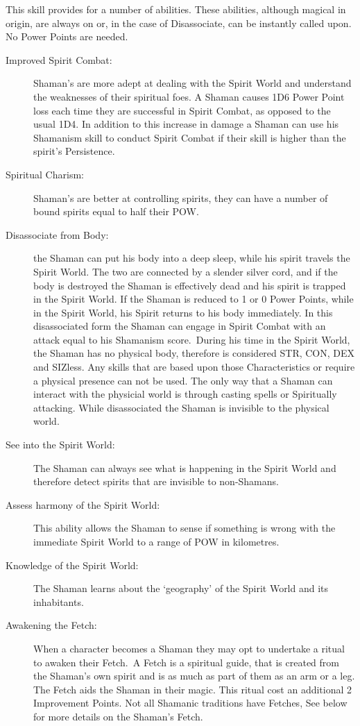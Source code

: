 This skill provides for a number of abilities. These abilities, although magical in origin, are always on or, in the case of Disassociate, can be instantly called upon. No Power Points are needed.

\begin{description}
\item[Improved Spirit Combat:] Shaman’s are more adept at dealing with the Spirit World and understand the weaknesses of their spiritual foes. A Shaman causes 1D6 Power Point loss each time they are successful in Spirit Combat, as opposed to the usual 1D4. In addition to this increase in damage a Shaman can use his Shamanism skill to conduct Spirit Combat if their skill is higher than the spirit’s Persistence.
\item[Spiritual Charism:] Shaman’s are better at controlling spirits, they can have a number of bound spirits equal to half their POW.
\item[Disassociate from Body:] the Shaman can put his body into a deep sleep, while his spirit travels the Spirit World. The two are connected by a slender silver cord, and if the body is destroyed the Shaman is effectively dead and his spirit is trapped in the Spirit World. If the Shaman is reduced to 1 or 0 Power Points, while in the Spirit World, his Spirit returns to his body immediately. In this disassociated form the Shaman can engage in Spirit Combat with an attack equal to his Shamanism score. During his time in the Spirit World, the Shaman has no physical body, therefore is considered STR, CON, DEX and SIZless. Any skills that are based upon those Characteristics or require a physical presence can not be used. The only way that a Shaman can interact with the physicial world is through casting spells or Spiritually attacking. While disassociated the Shaman is invisible to the physical world.
\item[See into the Spirit World:] The Shaman can always see what is happening in the Spirit World and therefore detect spirits that are invisible to non-Shamans.
\item[Assess harmony of the Spirit World:] This ability allows the Shaman to sense if something is wrong with the immediate Spirit World to a range of POW in kilometres. 
\item[Knowledge of the Spirit World:] The Shaman learns about the ‘geography’ of the Spirit World and its inhabitants.
\item[Awakening the Fetch:] When a character becomes a Shaman they may opt to undertake a ritual to awaken their Fetch. A Fetch is a spiritual guide, that is created from the Shaman’s own spirit and is as much as part of them as an arm or a leg. The Fetch aids the Shaman in their magic. This ritual cost an additional 2 Improvement Points. Not all Shamanic traditions have Fetches, See below for more details on the Shaman’s Fetch.  
\end{description}


